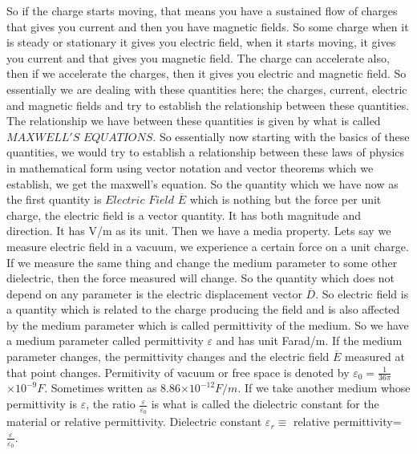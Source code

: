 So if the charge starts moving, that means you have a sustained flow of charges that gives you current and then you have magnetic fields. So some charge when it is steady or stationary it gives you electric field, when it starts moving, it gives you current and that gives you magnetic field.\newline
The charge can accelerate also, then if we accelerate the charges, then it gives you electric and magnetic field. So essentially we are dealing with these quantities here; the charges, current, electric and magnetic fields and try to establish the relationship between these quantities. The relationship we have between these quantities is given by what is called $MAXWELL'S$ $EQUATIONS$. So essentially now starting with the basics of these quantities, we would try to establish a relationship between these laws of physics in mathematical form using vector notation and vector theorems which we establish, we get the maxwell's equation. So the quantity which we have now as the first quantity is $Electric$ $Field$ $\overline{E}$ which is nothing but the force per unit charge, the electric field is a vector quantity. It has both magnitude and direction. It has V/m as its unit. Then we have a media property. Lets say we measure electric field in a vacuum, we experience a certain force on a unit charge. If we measure the same thing and change the medium parameter to some other dielectric, then the force measured will change. So the quantity which does not depend on any parameter is the electric displacement vector $\overline{D}$.
So electric field is a quantity which is related to the charge producing the field and is also affected by the medium parameter which is called permittivity of the medium. So we have a medium parameter called permittivity $\varepsilon$ 	and has unit Farad/m. If the medium parameter changes, the permittivity changes and the electric field $\overline{E}$ measured at that point changes. Permitivity of vacuum or free space is denoted by $\varepsilon_{0} =\frac{1}{36\pi}$ $\times 10^{-9}F$. Sometimes written as 8.86$\times10^{-12}F/m.$
If we take another medium whose permittivity is $\varepsilon$, the ratio $\frac{\varepsilon}{\varepsilon_{0}}$ is what is called the dielectric constant for the material or relative permittivity. 
Dielectric constant $\varepsilon_{r}\equiv$ relative permittivity= $\frac{\varepsilon}{\varepsilon_{0}}$.
